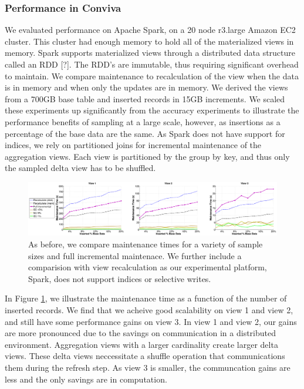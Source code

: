 \subsubsection{Performance in Conviva}
We evaluated performance on Apache Spark, on a 20 node r3.large Amazon EC2 cluster. 
This cluster had enough memory to hold all of the materialized views in memory.
Spark supports materialized views through a distributed data structure called an RDD [?].
The RDD's are immutable, thus requiring significant overhead to maintain.
We compare maintenance to recalculation of the view when the data is in memory and when only the updates are in memory. 
We derived the views from a 700GB base table and inserted records in 15GB increments. 
We scaled these experiments up significantly from the accuracy experiments to illustrate the performance benefits of sampling at a large scale, however, as insertions as a percentage of the base data are the same.
As Spark does not have support for indices, we rely on partitioned joins for incremental maintenance of the aggregation views.
Each view is partitioned by the group by key, and thus only the sampled delta view has to be shuffled. 

\begin{figure}[ht!]
\label{exp6conviva}
\hspace{-1em}
\vspace{-2em}
\includegraphics[scale=0.18]{exp/exp5-efficiency-conviva-woutlier.eps}
 \caption{As before, we compare maintenance times for a variety of sample sizes and full incremental maintenace. We further include a comparision with view recalculation as our experimental platform, Spark, does not support indices or selective writes.}
\end{figure}

In Figure \ref{exp6conviva}, we illustrate the maintenance time as a function of the number of inserted records.
We find that we acheive good scalability on view 1 and view 2, and still have some performance gains on view 3.
In view 1 and view 2, our gains are more pronounced due to the savings on communication in a distributed environment.
Aggregation views with a larger cardinality create larger delta views.
These delta views neccessitate a shuffle operation that communications them during the refresh step.
As view 3 is smaller, the communcation gains are less and the only savings are in computation.



